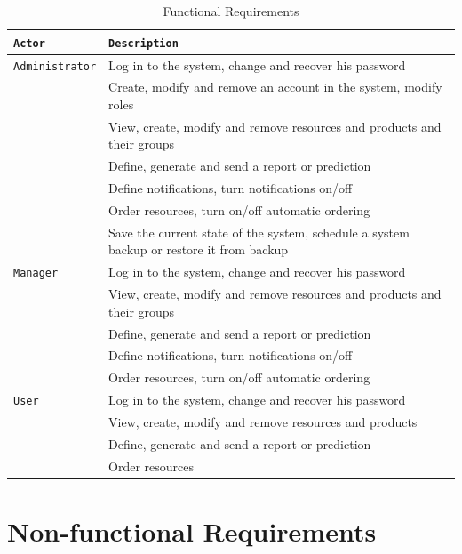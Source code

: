 \documentclass[a4paper,11pt,twoside]{report}
\theoremstyle{definition}
\begin{document}
\begin{longtable}{|p{3cm}||p{13cm}|}
\caption[Functional Requirements]{Functional Requirements}
\label{Functional Requirements}
\tabularnewline

\hline
\texttt{Actor} & \texttt{Description} \\ \hline
\texttt{Administrator} & Log in to the system, change and recover his password\\  \cline{2-2}
\texttt{} & Create, modify and remove an account in the system, modify roles\\  \cline{2-2}
\texttt{} & View, create, modify and remove resources and products and their groups\\ \cline{2-2}
\texttt{} & Define, generate and send a report or prediction\\ \cline{2-2}
\texttt{} & Define notifications, turn notifications on/off\\ \cline{2-2}
\texttt{} & Order resources, turn on/off automatic ordering\\ \cline{2-2}
\texttt{} & Save the current state of the system, schedule a system backup or restore it from backup\\ \hline
\texttt{Manager} & Log in to the system, change and recover his password\\  \cline{2-2}
\texttt{} & View, create, modify and remove resources and products and their groups\\ \cline{2-2}
\texttt{} & Define, generate and send a report or prediction\\ \cline{2-2}
\texttt{} & Define notifications, turn notifications on/off\\ \cline{2-2}
\texttt{} & Order resources, turn on/off automatic ordering\\ \hline
\texttt{User} & Log in to the system, change and recover his password\\  \cline{2-2}
\texttt{} & View, create, modify and remove resources and products\\ \cline{2-2}
\texttt{} & Define, generate and send a report or prediction\\ \cline{2-2}
\texttt{} & Order resources\\ \hline


\end{longtable}



\section{Non-functional Requirements}
\end{document}
